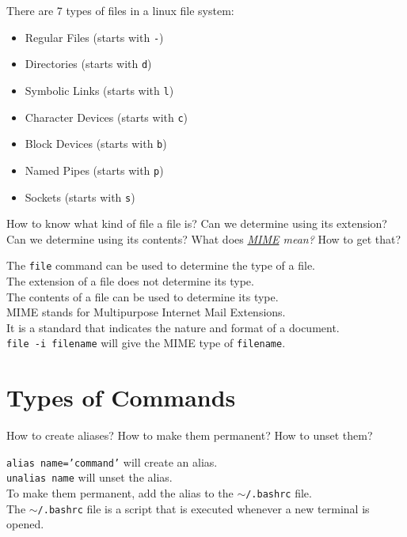 \begin{ans}
  There are 7 types of files in a linux file system:
  \begin{itemize}
    \item Regular Files (starts with \texttt{-})
    \item Directories (starts with \texttt{d})
    \item Symbolic Links (starts with \texttt{l})
    \item Character Devices (starts with \texttt{c})
    \item Block Devices (starts with \texttt{b})
    \item Named Pipes (starts with \texttt{p})
    \item Sockets (starts with \texttt{s})
  \end{itemize}
\end{ans}

\begin{qs}
  How to know what kind of file a file is? Can we determine using
  its extension? Can we determine using its contents? What does
  \textit{
  \href{https://developer.mozilla.org/en-US/docs/Web/HTTP/Basics_of_HTTP/MIME_types}{MIME} mean?
}
How to get that?
\end{qs}

\begin{ans}
  The \texttt{file} command can be used to determine the type of a file. \\
  The extension of a file does not determine its type. \\
  The contents of a file can be used to determine its type. \\
  MIME stands for Multipurpose Internet Mail Extensions. \\
  It is a standard that indicates the nature and format of a document. \\
  \texttt{file -i filename} will give the MIME type of \texttt{filename}.
\end{ans}
\section{Types of Commands}

\begin{qs}
  How to create aliases? How to make them permanent? How to unset them?
\end{qs}

\begin{ans}
  \texttt{alias name='command'} will create an alias. \\
  \texttt{unalias name} will unset the alias. \\
  To make them permanent, add the alias to the \texttt{$\sim$/.bashrc} file. \\
  The \texttt{$\sim$/.bashrc} file is a script that is executed whenever a new terminal is opened.
\end{ans}


